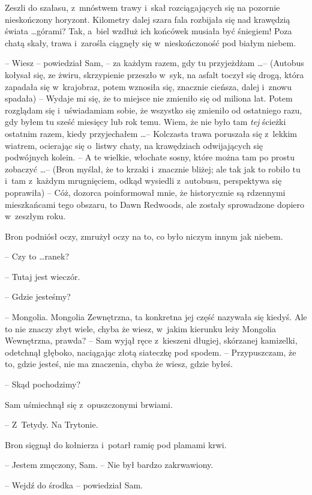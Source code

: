 \documentclass[oneside,polish,11pt,rmheadings]{mwbk}
\begin{document}
Zeszli do szałasu, z~mnóstwem trawy i~skał rozciągających się na pozornie nieskończony horyzont. Kilometry dalej szara fala rozbijała się nad krawędzią świata \ldots  górami? Tak, a~biel wzdłuż ich końcówek musiała być śniegiem! Poza chatą skały, trawa i~zarośla ciągnęły się w~nieskończoność pod białym niebem. 

-- Wiesz -- powiedział Sam, -- za każdym razem, gdy tu przyjeżdżam \ldots  -- (Autobus kołysał się, ze żwiru, skrzypienie przeszło w~syk, na asfalt toczył się drogą, która zapadała się w~krajobraz, potem wznosiła się, znacznie cieńsza, dalej i~znowu spadała) -- Wydaje mi się, że to miejsce nie zmieniło się od miliona lat. Potem rozglądam się i~uświadamiam sobie, że wszystko się zmieniło od ostatniego razu, gdy byłem tu sześć miesięcy lub rok temu. Wiem, że nie było tam \textit{tej }ścieżki ostatnim razem, kiedy przyjechałem \ldots  -- Kolczasta trawa poruszała się z~lekkim wiatrem, ocierając się o~listwy chaty, na krawędziach odwijających się podwójnych kolein. -- A te wielkie, włochate sosny, które można tam po prostu zobaczyć \ldots -- (Bron myślał, że to krzaki i~znacznie bliżej; ale tak jak to robiło tu i~tam z~każdym mrugnięciem, odkąd wysiedli z~autobusu, perspektywa się poprawiła) -- Cóż, dozorca poinformował mnie, że historycznie są rdzennymi mieszkańcami tego obszaru, to Dawn Redwoods, ale zostały sprowadzone dopiero w~zeszłym roku. 

Bron podniósł oczy, zmrużył oczy na to, co było niczym innym jak niebem. 

-- Czy to \ldots  ranek?

-- Tutaj jest wieczór. 

-- Gdzie jesteśmy? 

-- Mongolia. Mongolia Zewnętrzna, ta konkretna jej część nazywała się kiedyś. Ale to nie znaczy zbyt wiele, chyba że wiesz, w~jakim kierunku leży Mongolia Wewnętrzna, prawda? -- Sam wyjął ręce z~kieszeni długiej, skórzanej kamizelki, odetchnął głęboko, naciągając złotą siateczkę pod spodem. -- Przypuszczam, że to, gdzie jesteś, nie ma znaczenia, chyba że wiesz, gdzie byłeś. 

-- Skąd pochodzimy? 

Sam uśmiechnął się z~opuszczonymi brwiami. 

-- Z~Tetydy. Na Trytonie. 

Bron sięgnął do kołnierza i~potarł ramię pod plamami krwi.

-- Jestem zmęczony, Sam. -- Nie był bardzo zakrwawiony. 

-- Wejdź do środka -- powiedział Sam. 
\end{document}
